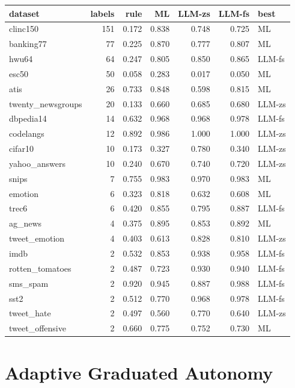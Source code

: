 {\def\LTcaptype{none} %
\begin{longtable}[]{@{}lrrrrrl@{}}
\toprule\noalign{}
dataset & labels & rule & ML & LLM-zs & LLM-fs & best \\
\midrule\noalign{}
\endhead
\bottomrule\noalign{}
\endlastfoot
clinc150 & 151 & 0.172 & 0.838 & 0.748 & 0.725 & ML \\
banking77 & 77 & 0.225 & 0.870 & 0.777 & 0.807 & ML \\
hwu64 & 64 & 0.247 & 0.805 & 0.850 & 0.865 & LLM-fs \\
esc50 & 50 & 0.058 & 0.283 & 0.017 & 0.050 & ML \\
atis & 26 & 0.733 & 0.848 & 0.598 & 0.815 & ML \\
twenty\_newsgroups & 20 & 0.133 & 0.660 & 0.685 & 0.680 & LLM-zs \\
dbpedia14 & 14 & 0.632 & 0.968 & 0.968 & 0.978 & LLM-fs \\
codelangs & 12 & 0.892 & 0.986 & 1.000 & 1.000 & LLM-zs \\
cifar10 & 10 & 0.173 & 0.327 & 0.780 & 0.340 & LLM-zs \\
yahoo\_answers & 10 & 0.240 & 0.670 & 0.740 & 0.720 & LLM-zs \\
snips & 7 & 0.755 & 0.983 & 0.970 & 0.983 & ML \\
emotion & 6 & 0.323 & 0.818 & 0.632 & 0.608 & ML \\
trec6 & 6 & 0.420 & 0.855 & 0.795 & 0.887 & LLM-fs \\
ag\_news & 4 & 0.375 & 0.895 & 0.853 & 0.892 & ML \\
tweet\_emotion & 4 & 0.403 & 0.613 & 0.828 & 0.810 & LLM-zs \\
imdb & 2 & 0.532 & 0.853 & 0.938 & 0.958 & LLM-fs \\
rotten\_tomatoes & 2 & 0.487 & 0.723 & 0.930 & 0.940 & LLM-fs \\
sms\_spam & 2 & 0.920 & 0.945 & 0.887 & 0.988 & LLM-fs \\
sst2 & 2 & 0.512 & 0.770 & 0.968 & 0.978 & LLM-fs \\
tweet\_hate & 2 & 0.497 & 0.560 & 0.770 & 0.640 & LLM-zs \\
tweet\_offensive & 2 & 0.660 & 0.775 & 0.752 & 0.730 & ML \\
\end{longtable}
}

\section{Adaptive Graduated Autonomy}\label{adaptive-graduated-autonomy}

